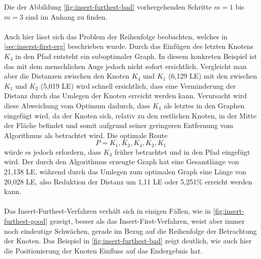 Die der Abbildung \vref{fig:insert-furthest-bad} vorhergehenden Schritte $m=1$ bis $m=3$ sind im Anhang zu finden. 
\\\\
Auch hier lässt sich das Problem der Reihenfolge beobachten, welches in \vref{sec:inserst-first-erg} beschrieben wurde.
Durch das Einfügen des letzten Knotens $K_4$ in den Pfad entsteht ein suboptimaler Graph.
In diesem konkreten Beispiel ist das mit dem menschlichen Auge jedoch nicht sofort ersichtlich.
Vergleicht man aber die Distanzen zwischen den Knoten $K_4$ und $K_1$ (6,129 \ac{LE}) mit den zwischen $K_1$ und $K_2$ (5,019 \ac{LE}) wird schnell ersichtlich, dass eine Verminderung der Distanz durch das Umlegen der Knoten erreicht werden kann.
Verursacht wird diese Abweichung vom Optimum dadurch, dass $K_4$ als letztes in den Graphen eingefügt wird, da der Knoten sich, relativ zu den restlichen Knoten, in der Mitte der Fläche befindet und somit aufgrund seiner geringeren Entfernung vom Algorithmus als betrachtet wird.
Die optimale Route
$$P = K_1, K_3, K_4, K_2, K_1$$ 
 würde es jedoch erfordern, dass $K_4$ früher betrachtet und in den Pfad eingefügt wird.
Der durch den Algorithmus erzeugte Graph hat eine Gesamtlänge von 21,138 \ac{LE}, während durch das Umlegen zum optimalen Graph eine Länge von 20,028 \ac{LE}, also Reduktion der Distanz um 1,11 \ac{LE} oder 5,251\% erreicht werden kann.
\\\\
Das Insert-Furthest-Verfahren verhält sich in einigen Fällen, wie in \vref{fig:insert-furthest-good} gezeigt, besser als das Insert-First-Verfahren, weist aber immer noch eindeutige Schwächen, gerade im Bezug auf die Reihenfolge der Betrachtung der Knoten.
Das Beispiel in \vref{fig:insert-furthest-bad} zeigt deutlich, wie auch hier die Positionierung der Knoten Einfluss auf das Endergebnis hat.